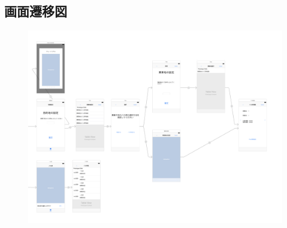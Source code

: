 \documentclass[openany,11pt,papersize]{jsbook}
\begin{document}


  \begin{appendix}
  
\chapter{画面遷移図}
\begin{figure}[htbp]
  \begin{center}
    \includegraphics[clip,width=19cm,angle=90]{img/picture.png}
    \label{fig:senni}
  \end{center}
\end{figure}


\end{appendix}
\end{document}
